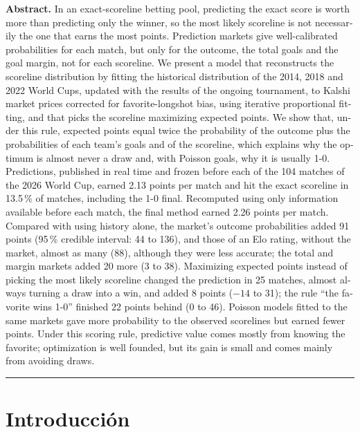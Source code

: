 \documentclass[12pt]{article}
\theoremstyle{plain}
\theoremstyle{remark}
\begin{document}
\bigskip

\begin{otherlanguage}{english}
\noindent\textbf{Abstract.}
In an exact-scoreline betting pool, predicting the exact score is
worth more than predicting only the winner, so the most likely
scoreline is not necessarily the one that earns the most points.
Prediction markets give well-calibrated probabilities for each match,
but only for the outcome, the total goals and the goal margin, not
for each scoreline.
We present a model that reconstructs the scoreline distribution by
fitting the historical distribution of the 2014, 2018 and 2022 World
Cups, updated with the results of the ongoing tournament, to Kalshi
market prices corrected for favorite-longshot bias, using iterative
proportional fitting, and that picks the scoreline maximizing
expected points.
We show that, under this rule, expected points equal twice the
probability of the outcome plus the probabilities of each team's goals
and of the scoreline, which explains why the optimum is almost never a
draw and, with Poisson goals, why it is usually 1-0.
Predictions, published in real time and frozen before each of the 104
matches of the 2026 World Cup, earned 2.13 points per match and
hit the exact scoreline in 13.5\,\% of matches, including the 1-0
final.
Recomputed using only information available before each match, the
final method earned 2.26 points per match.
Compared with using history alone, the market's outcome probabilities
added 91 points (95\,\% credible interval: 44 to 136), and those of an
Elo rating, without the market, almost as many (88), although they
were less accurate; the total and margin markets added 20 more (3 to
38).
Maximizing expected points instead of picking the most likely
scoreline changed the prediction in 25 matches, almost always turning
a draw into a win, and added 8 points ($-14$ to 31); the rule ``the
favorite wins 1-0'' finished 22 points behind (0 to 46).
Poisson models fitted to the same markets gave more probability to
the observed scorelines but earned fewer points.
Under this scoring rule, predictive value comes mostly from knowing
the favorite; optimization is well founded, but its gain is small and
comes mainly from avoiding draws.
\end{otherlanguage}

\bigskip\hrule

\section{Introducción}
\label{sec:intro}
\end{document}
